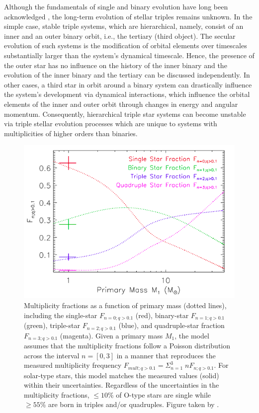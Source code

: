Although the fundamentals of single and binary evolution have long been acknowledged \citep{postnov2014evolution,toonen2014popcorn}, the long-term evolution of stellar triples remains unknown. In the simple case, stable triple systems, which are hierarchical, namely, consist of an inner and an outer binary orbit, i.e., the tertiary (third object). The secular evolution of such systems is the modification of orbital elements over timescales substantially larger than the system's dynamical timescale. Hence, the presence of the outer star has no influence on the history of the inner binary and the evolution of the inner binary and the tertiary can be discussed independently. In other cases, a third star in orbit around a binary system can drastically influence the system's development
via dynamical interactions, which influence the orbital elements of the inner and outer orbit through changes in energy and angular momentum. Consequently, hierarchical triple star systems can become unstable via triple stellar evolution processes which are unique to systems with multiplicities of higher orders than binaries.
\begin{figure}[H]
    \centering
    \includegraphics[width=\textwidth]{Thesis/figures/fig_moe_2017.png}
    \caption{Multiplicity fractions as a function of primary mass (dotted lines), including the single-star $F_{n=0;q> 0.1}$ (red), binary-star $F_{n=1;q> 0.1}$  (green), triple-star $F_{n=2;q> 0.1}$  (blue), and quadruple-star fraction $F_{n=3;q> 0.1}$  (magenta). Given a primary mass $M_1$, the model assumes that the multiplicity fractions follow a Poisson distribution across the interval $n = [0, 3]$ in a manner that reproduces the measured multiplicity frequency $F_{mult;q >0.1} = \Sigma_{n=1}^3 \; n F_{n;q> 0.1}$. For solar-type stars, this model matches the measured values (solid) within their uncertainties. Regardless of the uncertainties in the multiplicity fractions, $\leq 10\%$ of O-type stars are single while $\geq 55\%$ are born in triples and/or quadruples. Figure taken by \cite{moe2017mind}.}
    \label{fig:stellar_companions}
\end{figure}

